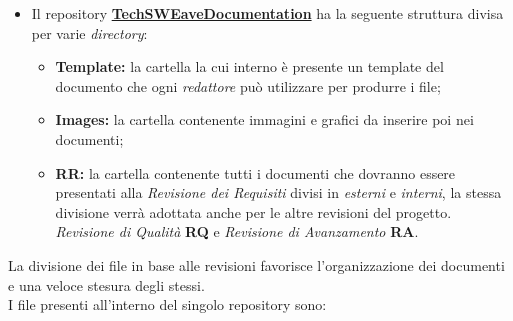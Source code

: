 \begin{itemize}
    \item Il repository  \textbf{\href{https://github.com/techsweave/TechSWEaveDocumentation.git}{TechSWEaveDocumentation}} ha la seguente struttura divisa per varie \textit{directory}:
          \begin{itemize}
              \item \textbf{Template:} la cartella la cui interno è presente un template del documento che ogni \textit{redattore} può utilizzare per produrre i file;
              \item \textbf{Images:} la cartella contenente immagini e grafici da inserire poi nei documenti;
              \item \textbf{RR:} la cartella contenente tutti i documenti che dovranno essere presentati alla \textit{Revisione dei Requisiti} divisi in \textit{esterni} e \textit{interni}, la stessa divisione verrà adottata anche per le altre revisioni del progetto. \textit{Revisione di Qualità} \textbf{RQ} e \textit{Revisione di Avanzamento} \textbf{RA}.
          \end{itemize}
\end{itemize}
La divisione dei file in base alle revisioni favorisce l'organizzazione dei documenti e una veloce stesura degli stessi.\\
I file presenti all'interno del singolo repository sono:
